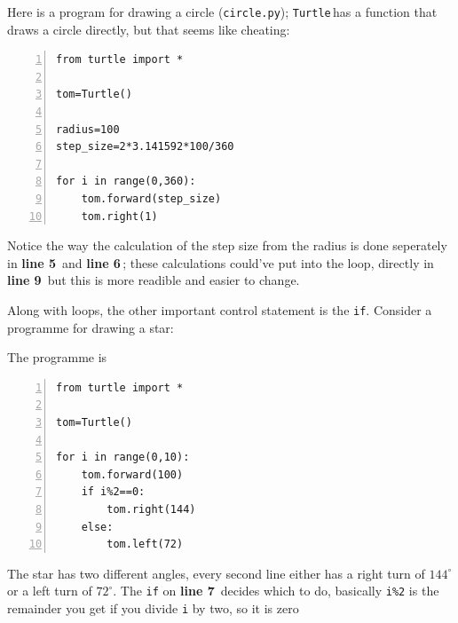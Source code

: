 \documentclass[11pt,a4paper]{scrartcl}
\newcommand{\turtle}{\texttt{Turtle}\,}
\newcommand{\lnn}[1]{\textbf{line #1}\,}
\begin{document}
Here is a program for drawing a circle (\texttt{circle.py}); \turtle has a function that draws a circle directly, but that seems like cheating:
\begin{lstlisting}[numbers=left]
from turtle import *

tom=Turtle()

radius=100
step_size=2*3.141592*100/360

for i in range(0,360):
    tom.forward(step_size)
    tom.right(1)
\end{lstlisting}
Notice the way the calculation of the step size from the radius is
done seperately in \lnn{5} and \lnn{6}; these calculations could've
put into the loop, directly in \lnn{9} but this is more readible and
easier to change.

Along with loops, the other important control statement is the
\texttt{if}. Consider a programme for drawing a star:
\begin{center}
\end{center}
The programme is
\begin{lstlisting}[numbers=left]
from turtle import *

tom=Turtle()

for i in range(0,10):
    tom.forward(100)
    if i%2==0:
        tom.right(144)
    else:
        tom.left(72)
\end{lstlisting}
The star has two different angles, every second line either has a
right turn of $144^\circ$ or a left turn of $72^\circ$. The
\texttt{if} on \lnn{7} decides which to do, basically \texttt{i\%2} is
the remainder you get if you divide \texttt{i} by two, so it is zero
\end{document}
